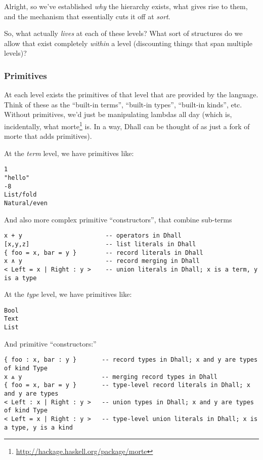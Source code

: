 \documentclass[]{article}
\renewcommand{\href}[2]{#2\footnote{\url{#1}}}
\begin{document}
Alright, so we've established \emph{why} the hierarchy exists, what gives rise
to them, and the mechanism that essentially cuts it off at \emph{sort}.

So, what actually \emph{lives} at each of these levels? What sort of structures
do we allow that exist completely \emph{within} a level (discounting things that
span multiple levels)?

\hypertarget{primitives}{%
\subsubsection{Primitives}\label{primitives}}

At each level exists the primitives of that level that are provided by the
language. Think of these as the ``built-in terms'', ``built-in types'',
``built-in kinds'', etc. Without primitives, we'd just be manipulating lambdas
all day (which is, incidentally, what
\href{http://hackage.haskell.org/package/morte}{morte} is. In a way, Dhall can
be thought of as just a fork of morte that adds primitives).

At the \emph{term} level, we have primitives like:

\begin{verbatim}
1
"hello"
-8
List/fold
Natural/even
\end{verbatim}

And also more complex primitive ``constructors'', that combine sub-terms

\begin{verbatim}
x + y                       -- operators in Dhall
[x,y,z]                     -- list literals in Dhall
{ foo = x, bar = y }        -- record literals in Dhall
x ∧ y                       -- record merging in Dhall
< Left = x | Right : y >    -- union literals in Dhall; x is a term, y is a type
\end{verbatim}

At the \emph{type} level, we have primitives like:

\begin{verbatim}
Bool
Text
List
\end{verbatim}

And primitive ``constructors:''

\begin{verbatim}
{ foo : x, bar : y }       -- record types in Dhall; x and y are types of kind Type
x ⩓ y                      -- merging record types in Dhall
{ foo = x, bar = y }       -- type-level record literals in Dhall; x and y are types
< Left : x | Right : y >   -- union types in Dhall; x and y are types of kind Type
< Left = x | Right : y >   -- type-level union literals in Dhall; x is a type, y is a kind
\end{verbatim}
\end{document}
